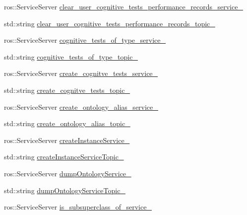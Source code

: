 \begin{DoxyCompactItemize}
\item 
ros\-::\-Service\-Server \hyperlink{classKnowrobWrapperCommunications_afc3b9e19e7d950f62dd29222a779ea30}{clear\-\_\-user\-\_\-cognitive\-\_\-tests\-\_\-performance\-\_\-records\-\_\-service\-\_\-}
\item 
std\-::string \hyperlink{classKnowrobWrapperCommunications_ac555026ed985ed7cc020b1f0c33ae054}{clear\-\_\-user\-\_\-cognitive\-\_\-tests\-\_\-performance\-\_\-records\-\_\-topic\-\_\-}
\item 
ros\-::\-Service\-Server \hyperlink{classKnowrobWrapperCommunications_ac2498f2732057c72fc4bbc0ffcb29c7b}{cognitive\-\_\-tests\-\_\-of\-\_\-type\-\_\-service\-\_\-}
\item 
std\-::string \hyperlink{classKnowrobWrapperCommunications_a40ffe00f1d833232faf6d265bd5276b8}{cognitive\-\_\-tests\-\_\-of\-\_\-type\-\_\-topic\-\_\-}
\item 
ros\-::\-Service\-Server \hyperlink{classKnowrobWrapperCommunications_a835254476d15a2c224069d4ff5ae0ce5}{create\-\_\-cognitve\-\_\-tests\-\_\-service\-\_\-}
\item 
std\-::string \hyperlink{classKnowrobWrapperCommunications_ab90753196ac931da226e940346162255}{create\-\_\-cognitve\-\_\-tests\-\_\-topic\-\_\-}
\item 
ros\-::\-Service\-Server \hyperlink{classKnowrobWrapperCommunications_a522e95f339e854d9202d212885cd542e}{create\-\_\-ontology\-\_\-alias\-\_\-service\-\_\-}
\item 
std\-::string \hyperlink{classKnowrobWrapperCommunications_ae3bf27737520a9ee4ce0ec43bffb15e4}{create\-\_\-ontology\-\_\-alias\-\_\-topic\-\_\-}
\item 
ros\-::\-Service\-Server \hyperlink{classKnowrobWrapperCommunications_a2be003e4372235aba8c48f08ee160bdb}{create\-Instance\-Service\-\_\-}
\item 
std\-::string \hyperlink{classKnowrobWrapperCommunications_ae4d64655c9da3ad80b79197f7cc761ef}{create\-Instance\-Service\-Topic\-\_\-}
\item 
ros\-::\-Service\-Server \hyperlink{classKnowrobWrapperCommunications_af0ad3b846b7441ed1256ab14501689dc}{dump\-Ontology\-Service\-\_\-}
\item 
std\-::string \hyperlink{classKnowrobWrapperCommunications_a581d7bbfc90299d80e504c59df83510d}{dump\-Ontology\-Service\-Topic\-\_\-}
\item 
ros\-::\-Service\-Server \hyperlink{classKnowrobWrapperCommunications_a9b20954a7983e1a0f842161d06555484}{is\-\_\-subsuperclass\-\_\-of\-\_\-service\-\_\-}

\end{DoxyCompactItemize}
